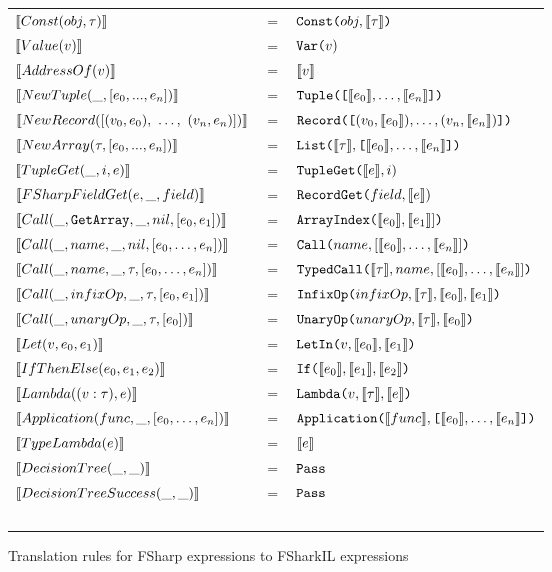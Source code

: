 \begin{figure}
  \centering
  \begin{tabular}{@{}l c l}%
  $\evals{Const(obj, \tau)}$ & $=$ & $\lit{Const(}obj, \evals{\tau} \lit{)}$ \\
  $\evals{Value(v)}$ & $=$ & $\lit{Var(}v{)}$ \\
  $\evals{AddressOf(v)}$ & $=$ & $\evals{v}$ \\
  $\evals{NewTuple(\_, [e_0,...,e_n])}$ & $=$ & $\lit{Tuple([}\evals{e_0},\ldots, \evals{e_n}\lit{])}$ \\
  $\evals{NewRecord([(v_0 , e_0),~\ldots,~(v_n , e_n)])}$ & $=$ & $\lit{Record([}(v_0,\evals{e_0}),\ldots,(v_n,\evals{e_n})\lit{])}$ \\
  $\evals{NewArray(\tau, [e_0,...,e_n])}$ & $=$ & $\lit{List(}\evals{\tau},\lit{[}\evals{e_0},\ldots, \evals{e_n}\lit{]}\lit{)}$ \\
  $\evals{TupleGet(\_, i, e)}$ & $=$ & $\lit{TupleGet(}\evals{e}, i{)}$ \\
  $\evals{FSharpFieldGet(e, \_, field)}$ & $=$ & $\lit{RecordGet(}field, \evals{e}{)}$ \\
    $\evals{Call(\_, \lit{GetArray}, \_, nil, [e_0, e_1])}$ & $=$ & $\lit{ArrayIndex(}\evals{e_0},\evals{e_1}]\lit{)}$ \\
    $\evals{Call(\_, name, \_, nil, [e_0, \ldots, e_n])}$ & $=$ & $\lit{Call(}name, [\evals{e_0},\ldots,\evals{e_n}]\lit{)}$ \\
    $\evals{Call(\_, name, \_, \tau, [e_0, \ldots, e_n])}$ & $=$ & $\lit{TypedCall(}\evals{\tau},name, [\evals{e_0}, \ldots, \evals{e_n}]\lit{)}$ \\
    $\evals{Call(\_, infixOp, \_, \tau, [e_0, e_1])}$ & $=$ & $\lit{InfixOp(}infixOp, \evals{\tau}, \evals{e_0}, \evals{e_1}\lit{)}$ \\
    $\evals{Call(\_, unaryOp, \_, \tau, [e_0])}$ & $=$ & $\lit{UnaryOp(}unaryOp, \evals{\tau}, \evals{e_0}\lit{)}$ \\
  $\evals{Let(v, e_0, e_1)}$ & $=$ & $\lit{LetIn(}v, \evals{e_0}, \evals{e_1}\lit{)}$ \\
  $\evals{IfThenElse(e_0, e_1, e_2)}$ & $=$ & $\lit{If(}\evals{e_0}, \evals{e_1}, \evals{e_2}\lit{)}$ \\
  $\evals{Lambda((v : \tau), e)}$ & $=$ & $\lit{Lambda(}v, \evals{\tau}, \evals{e} \lit{)}$ \\
  $\evals{Application(func, \_, [e_0, \ldots, e_n])}$ & $=$ & $\lit{Application(}\evals{func}, \lit{[}\evals{e_0},\ldots, \evals{e_n}\lit{])}$ \\
  $\evals{TypeLambda(e)}$ & $=$ & $\evals{e}$ \\
  $\evals{DecisionTree(\_, \_)}$ & $=$ & $\lit{Pass}$ \\
  $\evals{DecisionTreeSuccess(\_, \_)}$ & $=$ & $\lit{Pass}$ \\ ~ \\
\end{tabular}
\caption{Translation rules for FSharp expressions to FSharkIL expressions}
\label{fig:fsharpexprstofsharkexprs}
\end{figure}




